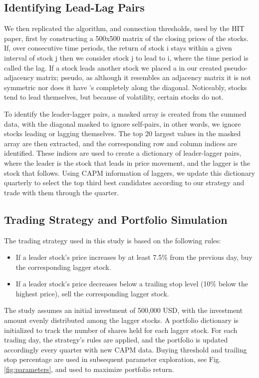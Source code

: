\documentclass{article}
\begin{document}
\subsection{Identifying Lead-Lag Pairs}
We then replicated the algorithm, and connection thresholds, used by the HIT paper, first by constructing a 500x500 matrix of the closing prices of the stocks. If, over consecutive time periods, the return of stock {\selectfont
i} stays within a given interval of stock {\selectfont
j} then we consider stock {\selectfont
j} to lead to {\selectfont
i}, where the time period is called the lag. If a stock leads another stock we placed a {} in our created pseudo-adjacency matrix; pseudo, as although it resembles an adjacency matrix it is not symmetric nor does it have {}'s completely along the diagonal. Noticeably, stocks tend to lead themselves, but because of volatility, certain stocks do not. 

To identify the leader-lagger pairs, a masked array is created from the summed data, with the diagonal masked to ignore self-pairs, in other words, we ignore stocks leading or lagging themselves. The top 20 largest values in the masked array are then extracted, and the corresponding row and column indices are identified. These indices are used to create a dictionary of leader-lagger pairs, where the leader is the stock that leads in price movement, and the lagger is the stock that follows. Using CAPM information of laggers, we update this dictionary quarterly to select the top third best candidates according to our strategy and trade with them through the quarter.
\subsection{Trading Strategy and Portfolio Simulation}
The trading strategy used in this study is based on the following rules:
\begin{itemize}
    \item If a leader stock's price increases by at least 7.5\% from the previous day, buy the corresponding lagger stock.
    \item If a leader stock's price decreases below a trailing stop level (10\% below the highest price), sell the corresponding lagger stock.
\end{itemize}
The study assumes an initial investment of 500,000 USD, with the investment amount evenly distributed among the lagger stocks. A portfolio dictionary is initialized to track the number of shares held for each lagger stock. For each trading day, the strategy's rules are applied, and the portfolio is updated accordingly every quarter with new CAPM data. Buying threshold and trailing stop percentage are used in subsequent parameter exploration, see Fig. \ref{fig:parameters}, and used to maximize portfolio return.
\end{document}
